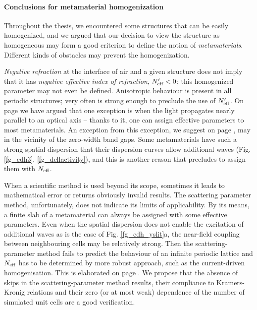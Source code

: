 \paragraph{Conclusions for metamaterial homogenization}
Throughout the thesis, we encountered some structures that can be easily homogenized, and we argued that our decision to view the structure as homogeneous may form a good criterion to define the notion of \textit{metamaterials}. Different kinds of obstacles may prevent the homogenization.

\textit{Negative refraction} at the interface of air and a given structure does not imply that it has \textit{negative effective index of refraction}, $N_{\text{eff} }'<0$; this homogenized parameter may not even be defined. Anisotropic behaviour is present in all periodic structures; very often is strong enough to preclude the use of $N_{\text{eff} }'$. On page \pageref{indexofrefraction} we have argued that one exception is when the light propagates nearly parallel to an optical axis -- thanks to it, one can assign effective parameters to most metamaterials. An exception from this exception, we suggest on page \pageref{diracpoint}, may in the vicinity of the zero-width band gaps. 
Some metamaterials have such a strong spatial dispersion that their dispersion curves allow additional waves (Fig. \ref{fg_cdh3}, \ref{fg_dcllactivity}), and this is another reason that precludes to assign them with $N_{\text{eff} }$. 

When a scientific method is used beyond its scope, sometimes it leads to mathematical error or returns obviously invalid results. The scattering parameter method, unfortunately, does not indicate its limits of applicability. By its means, a finite slab of a metamaterial can always be assigned with some effective parameters. Even when the spatial dispersion does not enable the excitation of additional waves as is the case of Fig. \ref{fg_cdh_yslit}a, the near-field coupling between neighbouring cells may be relatively strong. Then the scattering-parameter method fails to predict the behaviour of an infinite periodic lattice and $N_{\text{eff} }$ has to be determined by more robust approach, such as the current-driven homogenisation. This is elaborated on page \pageref{sparamweaknesses}. We propose that the absence of skips in the scattering-parameter method results, their compliance to Kramers-Kronig relations and their zero (or at most weak) dependence of the number of simulated unit cells are a good verification.

